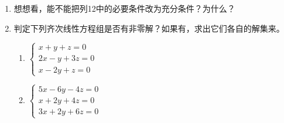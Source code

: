 \begin{ex}
\begin{enumerate}
    \item 想想看，能不能把列12中的必要条件改为充分条件？为什么？
    \item 判定下列齐次线性方程组是否有非零解？如果有，求出它们各自的解集来。
    \begin{multicols}{2}
\begin{enumerate}
    \item $\begin{cases}
        x+y+z=0\\2x-y+3z=0\\x-2y+z=0
    \end{cases}$
    \item $\begin{cases}
        5x-6y-4z=0\\x+2y+4z=0\\3x+2y+6z=0
    \end{cases}$
\end{enumerate}        
    \end{multicols}
\end{enumerate}    
\end{ex}

